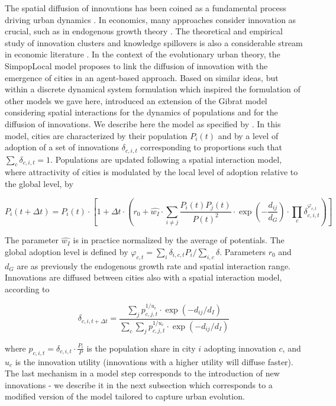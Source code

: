 \documentclass[10pt]{article}
\begin{document}
The spatial diffusion of innovations has been coined as a fundamental process driving urban dynamics \citep{hagerstrand1968innovation}. In economics, many approaches consider innovation as crucial, such as in endogenous growth theory \citep{aghion1998endogenous}. The theoretical and empirical study of innovation clusters and knowledge spillovers is also a considerable stream in economic literature \citep{audretsch2005does}. In the context of the evolutionary urban theory, the SimpopLocal model \citep{schmitt2014modelisation} proposes to link the diffusion of innovation with the emergence of cities in an agent-based approach. Based on similar ideas, but within a discrete dynamical system formulation which inspired the formulation of other models we gave here,  \cite{favaro2011gibrat} introduced an extension of the Gibrat model considering spatial interactions for the dynamics of populations and for the diffusion of innovations. We describe here the model as specified by \citep{raimbault2020model}. In this model, cities are characterized by their population $P_i(t)$ and by a level of adoption of a set of innovations $\delta_{c,i,t}$ corresponding to proportions such that $\sum_c \delta_{c,i,t} = 1$. Populations are updated following a spatial interaction model, where attractivity of cities is modulated by the local level of adoption relative to the global level, by

\begin{equation}
	P_i (t+\Delta t) = P_i(t) \cdot \left[1 + \Delta t \cdot \left(r_0 + \hat{w_I} \cdot \sum_{i\neq j} \frac{P_i(t) P_j(t)}{P(t)^2} \cdot \exp \left(- \frac{d_{ij}}{d_G} \right) \cdot \prod_c \delta_{c,i,t}^{\varphi_{c,t}} \right) \right]
\end{equation}


The parameter $\hat{w_I}$ is in practice normalized by the average of potentials. The global adoption level is defined by $\varphi_{c,t} = \sum_i \delta_{i,c,t} P_i / \sum_{i,c} \delta$. Parameters $r_0$ and $d_G$ are as previously the endogenous growth rate and spatial interaction range. Innovations are diffused between cities also with a spatial interaction model, according to

\begin{equation}
	\delta_{c,i,t+\Delta t} = \frac{\sum_j p_{c,j,t}^{1/u_c}\cdot \exp\left(-d_{ij}/d_I\right)}{\sum_c\sum_j p_{c,j,t}^{1/u_c}\cdot \exp\left(-d_{ij}/d_I\right)}	
\end{equation}

where $p_{c,i,t} = \delta_{c,i,t}\cdot \frac{P_i}{P}$ is the population share in city $i$ adopting innovation $c$, and $u_c$ is the innovation utility (innovations with a higher utility will diffuse faster). The last mechanism in a model step corresponds to the introduction of new innovations - we describe it in the next subsection which corresponds to a modified version of the model tailored to capture urban evolution.
\end{document}
